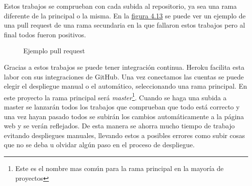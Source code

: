 Estos trabajos se comprueban con cada subida al repositorio, ya sea una rama
diferente de la principal o la misma. En la \hyperref[fig:Ejemplo pull request]{figura 4.13}
se puede ver un ejemplo de una pull request de una rama secundaria en la que
fallaron estos trabajos pero al final todos fueron positivos.

\begin{figure}[htb]
  \centering
  \scalebox{.8}{\texttt{[image: CI]}}
  \caption[Ejemplo pull request]{Ejemplo pull request}
  \label{fig:Ejemplo pull request}
\end{figure}

Gracias a estos trabajos se puede tener integración continua. Heroku facilita
esta labor con sus integraciones de GitHub. Una vez conectamos las cuentas se
puede elegir el despliegue manual o el automático, seleccionando una rama principal.
En este proyecto la rama principal será \textit{master}\footnote{Este es el nombre mas común para la rama principal en la mayoría de proyectos}. Cuando se haga una subida a master
se lanzarán todos los trabajos que comprueban que todo está correcto y una vez hayan
pasado todos se subirán los cambios automáticamente a la página web y se verán reflejados.
De esta manera se ahorra mucho tiempo de trabajo evitando despliegues manuales, llevando estos
a posibles errores como subir cosas que no se deba u olvidar algún paso en el proceso
de despliegue.
